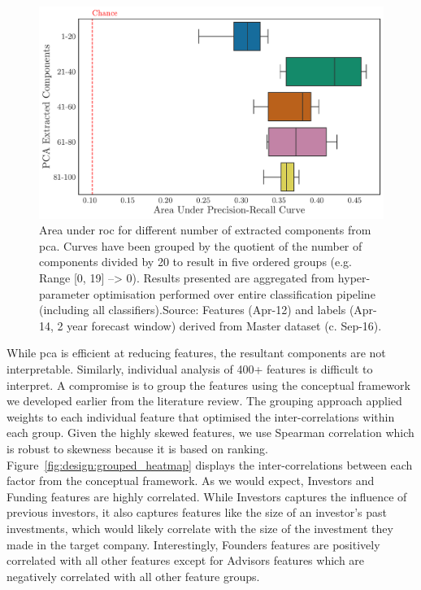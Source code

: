 \documentclass[../thesis/thesis.tex]{subfiles}
\begin{document}
\begin{figure}[!htb]
    \centering
    \includegraphics[width=\textwidth]{../figures/design/extracter}
    \caption[Area under PR Curves by PCA techniques]{Area under \gls{roc} for different number of extracted components from \gls{pca}. Curves have been grouped by the quotient of the number of components divided by 20 to result in five ordered groups (e.g. Range [0, 19] --> 0). Results presented are aggregated from hyper-parameter optimisation performed over entire classification pipeline (including all classifiers).Source: Features (Apr-12) and labels (Apr-14, 2 year forecast window) derived from Master dataset (c. Sep-16).}
    \label{fig:design:extracter}
\end{figure}

While \gls{pca} is efficient at reducing features, the resultant components are not interpretable. Similarly, individual analysis of 400+ features is difficult to interpret. A compromise is to group the features using the conceptual framework we developed earlier from the literature review. The grouping approach applied weights to each individual feature that optimised the inter-correlations within each group. Given the highly skewed features, we use Spearman correlation which is robust to skewness because it is based on ranking. Figure~\ref{fig:design:grouped_heatmap} displays the inter-correlations between each factor from the conceptual framework. As we would expect, Investors and Funding features are highly correlated. While Investors captures the influence of previous investors, it also captures features like the size of an investor's past investments, which would likely correlate with the size of the investment they made in the target company. Interestingly, Founders features are positively correlated with all other features except for Advisors features which are negatively correlated with all other feature groups.
\end{document}
